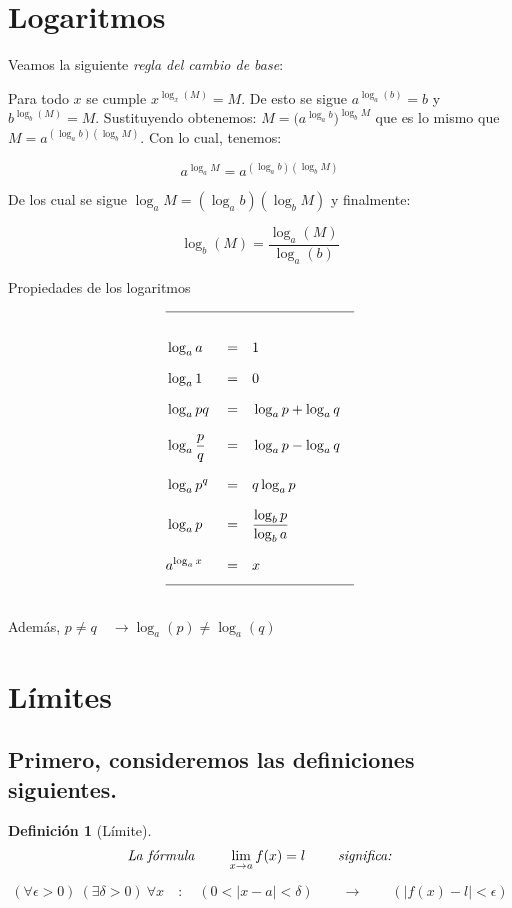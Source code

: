 \documentclass[12pt,a4paper]{extarticle}
\title{}
\newtheorem{mydef}{Definici\'on}[section]
\begin{document}
\maketitle

\section{Logaritmos}
Veamos la siguiente \emph{regla del cambio de base}:

Para todo \( x \)  se cumple \( x^{\log_x(M)} = M \). De esto se sigue
\( a^{\log_a(b)} = b \) y \( b^{\log_b(M)} = M \). Sustituyendo
obtenemos: \(M= \big(a^{\log_a b}\big)^{\log_b M} \) que es lo mismo que
\(M= a^{(\log_a b)(\log_b M)}   \). Con lo cual, tenemos:


\[a^{\log_a M} = a^{(\log_a b)(\log_b M)} \]

De los cual se sigue \( \log_a M = (\log_a b)(\log_b M) \)  y
finalmente:

\begin{equation}
\log_b(M) = \frac{\log_a(M)}{\log_a(b)}
\end{equation}

\begin{table}[!htbp]
\caption{Propiedades de los logaritmos}
\begin{align*}
\hline\\[0.5em]
&\log_a{a} &&=&& 1 &\\[0.7em]
&\log_a{1} &&=&& 0 &\\[0.7em]
&\log_a{pq} &&=&& \log_a{p} + \log_a{q}&\\[0.7em]
&\log_a{\frac{p}{q}} &&=&& \log_a{p} - \log_a{q} &\\[0.7em]
&\log_a{p^q} &&=&& q\log_a{p} &\\[0.7em]
&\log_a{p} &&=&& \frac{\log_b{p}}{\log_b{a}}&\\[0.7em]
&a^{\log_a{x}} &&=&& x&\\[0.7em]
\hline \\
\end{align*}
\label{tab:loga}
\end{table}

Adem\'as, \(p \neq q \quad \to  \log_a(p) \neq \log_a(q)\) \\

\section{L\'imites}

\subsection{Primero, consideremos las definiciones siguientes.}
\begin{mydef}[L\'imite]
\[\emph{La f\'ormula }  \qquad \lim_{x \to a}f(x) = l \qquad \emph{ significa:}\]

\begin{equation}
(\forall \epsilon > 0) \ (\exists \delta > 0) \ \forall x \quad : \quad (0<|x-a|<
\delta)
\qquad  \to \qquad ( |f(x) - l| < \epsilon   )
\end{equation}
\end{mydef}
\end{document}
